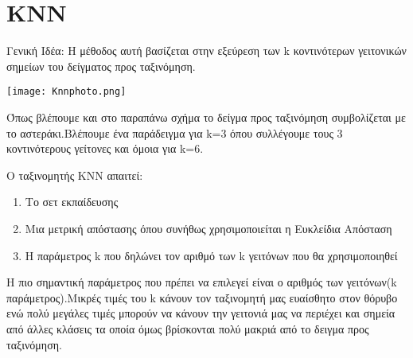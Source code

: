 \section{KNN}

Γενική Ιδέα: Η μέθοδος αυτή βασίζεται στην εξεύρεση των k κοντινότερων γειτονικών σημείων του δείγματος προς ταξινόμηση.

\begin{center}
	\texttt{[image: Knnphoto.png]}
	\label{fig:KNN}  
\end{center}

Όπως βλέπουμε και στο παραπάνω σχήμα το δείγμα προς ταξινόμηση συμβολίζεται με το αστεράκι.Βλέπουμε ένα παράδειγμα για k=3 όπου συλλέγουμε τους 3 κοντινότερους γείτονες και όμοια για k=6.

Ο ταξινομητής ΚΝΝ απαιτεί:
\begin{enumerate}
	\item Το σετ εκπαίδευσης
	\item Μια μετρική απόστασης όπου συνήθως χρησιμοποιείται η Ευκλείδια Απόσταση
	\item Η παράμετρος k που δηλώνει τον αριθμό των k γειτόνων που θα χρησιμοποιηθεί
\end{enumerate}

Η πιο σημαντική παράμετρος που πρέπει να επιλεγεί είναι ο αριθμός των γειτόνων(k παράμετρος).Μικρές τιμές του k κάνουν τον ταξινομητή μας ευαίσθητο στον θόρυβο ενώ πολύ μεγάλες τιμές μπορούν να κάνουν την γειτονιά μας να περιέχει και σημεία από άλλες κλάσεις τα οποία όμως βρίσκονται πολύ μακριά από το δειγμα προς ταξινόμηση.


